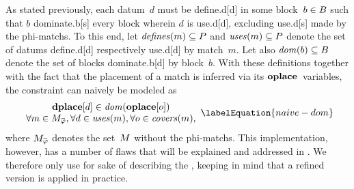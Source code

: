 As stated previously, each \gls{datum}~$d$ must be \gls{define.d}[d] in some
\gls{block}~\mbox{$b \in B$} such that $b$ \gls{dominate.b}[s] every
\gls{block} wherein $d$ is \gls{use.d}[d], excluding \gls{use.d}[s] made by the
\glspl{phi-match}.
%
To this end, let \mbox{$\mDefines(m) \subseteq \mOperandSet$} and
\mbox{$\mUses(m) \subseteq \mOperandSet$} denote the set of \glspl{datum}
\gls{define.d}[d] respectively \gls{use.d}[d] by \gls{match}~$m$.
%
Let also \mbox{$\operatorname{\textrm{\textit{dom}}}(b) \subseteq B$} denote the set of \glspl{block}
\gls{dominate.b}[d] by \gls{block}~$b$.
%
With these definitions together with the fact that the placement of a
\gls{match} is inferred via its $\mVar{oplace}$~\glspl{variable}, the
\gls{constraint} can naively be modeled as
%
\begin{equation}
  \begin{array}{c}
    \mVar{dplace}[d] \in \mDom(\mVar{oplace}[o]) \\
    \forall m \in \mPhiMatchCompSet,
    \forall d \in \mUses(m),
    \forall o \in \mCovers(m),
  \end{array}
  \labelEquation{naive-dom}
\end{equation}
%
where $\mPhiMatchCompSet$ denotes the set~$\mMatchSet$ without the
\glspl{phi-match}.
%
This implementation, however, has a number of flaws that will be explained and
addressed in .
%
We therefore only use  for sake of describing the
, keeping in mind that a refined version is applied
in practice.

